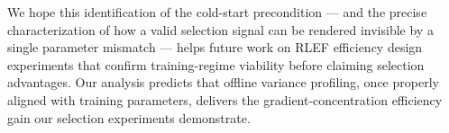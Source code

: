 We hope this identification of the cold-start precondition --- and the precise characterization of how a valid selection signal can be rendered invisible by a single parameter mismatch --- helps future work on RLEF efficiency design experiments that confirm training-regime viability before claiming selection advantages. Our analysis predicts that offline variance profiling, once properly aligned with training parameters, delivers the gradient-concentration efficiency gain our selection experiments demonstrate.
